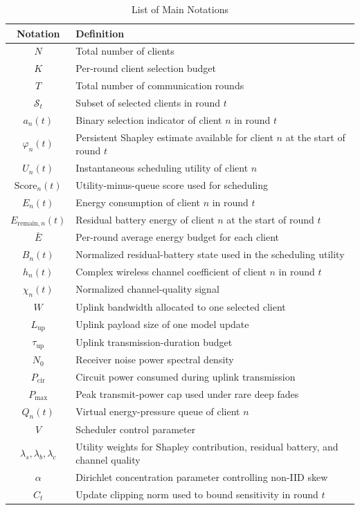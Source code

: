 \documentclass[journal]{IEEEtran}
\begin{document}
\begin{table}[t]
\centering
\caption{List of Main Notations}
\label{tab:notation}
\small
\setlength{\tabcolsep}{3pt}
\begin{tabular}{c p{}}
\hline
\textbf{Notation} & \textbf{Definition} \\
\hline
$N$ & Total number of clients \\
$K$ & Per-round client selection budget \\
$T$ & Total number of communication rounds \\
$\mathcal{S}_t$ & Subset of selected clients in round $t$ \\
$a_n(t)$ & Binary selection indicator of client $n$ in round $t$ \\
$\varphi_n(t)$ & Persistent Shapley estimate available for client $n$ at the start of round $t$ \\
$U_n(t)$ & Instantaneous scheduling utility of client $n$ \\
$\mathrm{Score}_n(t)$ & Utility-minus-queue score used for scheduling \\
$E_n(t)$ & Energy consumption of client $n$ in round $t$ \\
$E_{\text{remain},n}(t)$ & Residual battery energy of client $n$ at the start of round $t$ \\
$\bar{E}$ & Per-round average energy budget for each client \\
$B_n(t)$ & Normalized residual-battery state used in the scheduling utility \\
$h_n(t)$ & Complex wireless channel coefficient of client $n$ in round $t$ \\
$\chi_n(t)$ & Normalized channel-quality signal \\
$W$ & Uplink bandwidth allocated to one selected client \\
$L_{\mathrm{up}}$ & Uplink payload size of one model update \\
$\tau_{\mathrm{up}}$ & Uplink transmission-duration budget \\
$N_0$ & Receiver noise power spectral density \\
$P_{\mathrm{cir}}$ & Circuit power consumed during uplink transmission \\
$P_{\max}$ & Peak transmit-power cap used under rare deep fades \\
$Q_n(t)$ & Virtual energy-pressure queue of client $n$ \\
$V$ & Scheduler control parameter \\
$\lambda_s,\lambda_b,\lambda_c$ & Utility weights for Shapley contribution, residual battery, and channel quality \\
$\alpha$ & Dirichlet concentration parameter controlling non-IID skew \\
$C_t$ & Update clipping norm used to bound sensitivity in round $t$ \\
\hline
\end{tabular}
\end{table}
\end{document}
